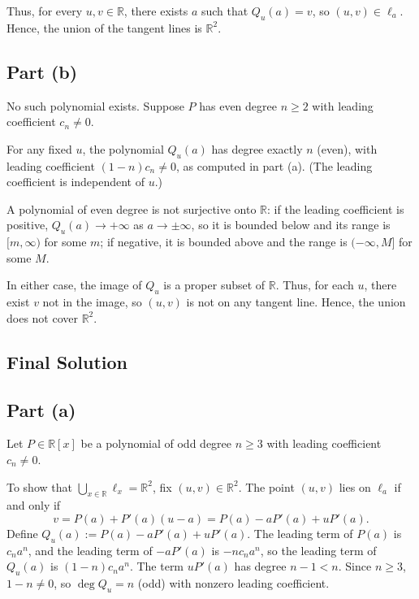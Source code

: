 \documentclass[12pt,a4paper]{article}
\theoremstyle{definition}
\begin{document}
    Thus, for every $u, v \in \mathbb{R}$, there exists $a$ such that $Q_u(a) = v$, so $(u, v) \in \ell_a$. Hence, the union of the tangent lines is $\mathbb{R}^2$.

    \subsection*{Part (b)}

    No such polynomial exists. Suppose $P$ has even degree $n \geq 2$ with leading coefficient $c_n \neq 0$.

    For any fixed $u$, the polynomial $Q_u(a)$ has degree exactly $n$ (even), with leading coefficient $(1 - n) c_n \neq 0$, as computed in part (a). (The leading coefficient is independent of $u$.)

    A polynomial of even degree is not surjective onto $\mathbb{R}$: if the leading coefficient is positive, $Q_u(a) \to +\infty$ as $a \to \pm \infty$, so it is bounded below and its range is $[m, \infty)$ for some $m$; if negative, it is bounded above and the range is $(-\infty, M]$ for some $M$.

    In either case, the image of $Q_u$ is a proper subset of $\mathbb{R}$. Thus, for each $u$, there exist $v$ not in the image, so $(u, v)$ is not on any tangent line. Hence, the union does not cover $\mathbb{R}^2$.

\subsection{Final Solution}
    \subsection*{Part (a)}

    Let $P \in \mathbb{R}[x]$ be a polynomial of odd degree $n \geq 3$ with leading coefficient $c_n \neq 0$.

    To show that $\bigcup_{x \in \mathbb{R}} \ell_x = \mathbb{R}^2$, fix $(u, v) \in \mathbb{R}^2$. The point $(u, v)$ lies on $\ell_a$ if and only if
    \[
        v = P(a) + P'(a)(u - a) = P(a) - a P'(a) + u P'(a).
    \]
    Define $Q_u(a) := P(a) - a P'(a) + u P'(a)$. The leading term of $P(a)$ is $c_n a^n$, and the leading term of $-a P'(a)$ is $-n c_n a^n$, so the leading term of $Q_u(a)$ is $(1 - n) c_n a^n$. The term $u P'(a)$ has degree $n-1 < n$. Since $n \geq 3$, $1 - n \neq 0$, so $\deg Q_u = n$ (odd) with nonzero leading coefficient.
\end{document}

